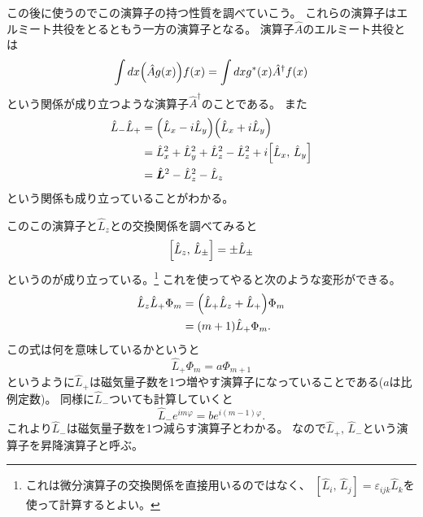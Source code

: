\documentclass[../../master.tex]{subfiles}
\begin{document}
この後に使うのでこの演算子の持つ性質を調べていこう。
これらの演算子はエルミート共役をとるともう一方の演算子となる。
演算子\(\hat{A}\)のエルミート共役とは
\begin{equation}
	\int dx \qty(\hat{A}g(x)) f(x) = \int dx g^*(x) \hat{A}^\dag f(x)
\end{equation}
という関係が成り立つような演算子\(\hat{A}^\dag\)のことである。
また
\begin{align}
	\hat{L}_- \hat{L}_+ & = \qty(\hat{L}_x - i \hat{L}_y)\qty(\hat{L}_x + i\hat{L}_y)                         \\
	                    & =\hat{L}_x^2+\hat{L}_y^2 + \hat{L}_z^2 - \hat{L}_z^2 + i\qty[\hat{L}_x,\,\hat{L}_y] \\
	                    & =\hat{\vb*{L}}^2 -\hat{L}_z^2 -\hat{L}_z
\end{align}
という関係も成り立っていることがわかる。

このこの演算子と\(\hat{L}_z\)との交換関係を調べてみると
\begin{equation}
	\qty[\hat{L}_z,\,\hat{L}_\pm] = \pm \hat{L}_\pm
\end{equation}
というのが成り立っている。\footnote{これは微分演算子の交換関係を直接用いるのではなく、
	\([\hat{L}_i,\,\hat{L}_j]=\varepsilon_{ijk}\hat{L}_k\)を使って計算するとよい。}
これを使ってやると次のような変形ができる。
\begin{align}
	\hat{L}_z\hat{L}_+ \Phi_m
	 & = \qty(\hat{L}_+\hat{L}_z + \hat{L}_+)\Phi_m \\
	 & = (m+1)\hat{L}_+\Phi_m.
\end{align}
この式は何を意味しているかというと
\begin{equation}
	\hat{L}_+ \Phi_m = a \Phi_{m+1}
\end{equation}
というように\(\hat{L}_+\)は磁気量子数を1つ増やす演算子になっていることである(\(a\)は比例定数)。
同様に\(\hat{L}_-\)ついても計算していくと
\begin{equation}
	\hat{L}_- e^{im\varphi} =b e^{i(m-1)\varphi}.
\end{equation}
これより\(\hat{L}_-\)は磁気量子数を1つ減らす演算子とわかる。
なので\(\hat{L}_+,\,\hat{L}_-\)という演算子を昇降演算子と呼ぶ。
\end{document}
